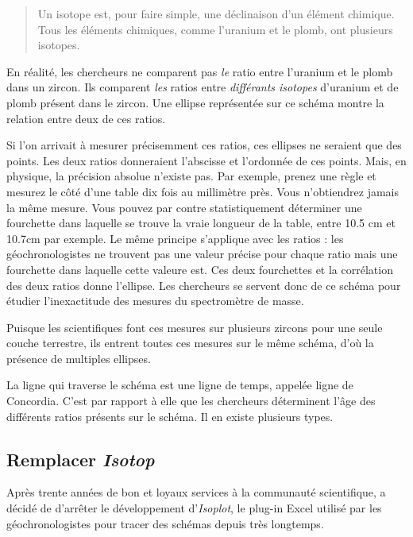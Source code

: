 \begin{quote}
Un isotope est, pour faire simple, une déclinaison d'un élément chimique. Tous les éléments chimiques, comme l'uranium et le plomb, ont plusieurs isotopes.
\end{quote}

En réalité, les chercheurs ne comparent pas \emph{le} ratio entre l'uranium et le plomb dans un zircon. Ils comparent \emph{les} ratios entre \emph{différants isotopes} d'uranium et de plomb présent dans le zircon.
Une ellipse représentée sur ce schéma montre la relation entre deux de ces ratios.

Si l'on arrivait à mesurer précisemment ces ratios, ces ellipses ne seraient que des points. Les deux ratios donneraient l'abscisse et l'ordonnée de ces points. Mais, en physique, la précision absolue n'existe pas. Par exemple, prenez une règle et mesurez le côté d'une table dix fois au millimètre près. Vous n'obtiendrez jamais la même mesure. Vous pouvez par contre statistiquement déterminer une fourchette dans laquelle se trouve la vraie longueur de la table, entre 10.5 cm et 10.7cm par exemple. Le même principe s'applique avec les ratios : les géochronologistes ne trouvent pas une valeur précise pour chaque ratio mais une fourchette dans laquelle cette valeure est. Ces deux fourchettes et la corrélation des deux ratios donne l'ellipse. Les chercheurs se servent donc de ce schéma pour étudier l'inexactitude des mesures du spectromètre de masse.

Puisque les scientifiques font ces mesures sur plusieurs zircons pour une seule couche terrestre, ils entrent toutes ces mesures sur le même schéma, d'où la présence de multiples ellipses.

La ligne qui traverse le schéma est une ligne de temps, appelée ligne de Concordia. C'est par rapport à elle que les chercheurs déterminent l'âge des différents ratios présents sur le schéma. Il en existe plusieurs types.

\subsection{Remplacer \textit{Isotop}}
Après trente années de bon et loyaux services à la communauté scientifique, %
a décidé de d'arrêter le développement d'\textit{Isoplot}, le plug-in Excel utilisé par les géochronologistes pour tracer des schémas depuis très longtemps.

